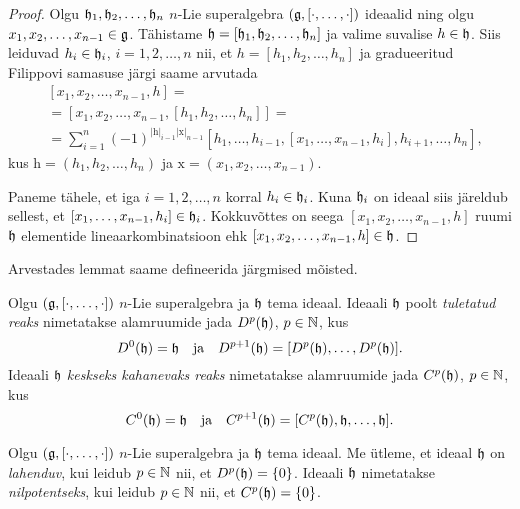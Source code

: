 \begin{proof}
    Olgu $\mathfrak{h}_1, \mathfrak{h}_2, \dots, \mathfrak{h}_n$ $n$-Lie superalgebra
    $(\mathfrak{g}, [\cdot, \dots, \cdot])$ ideaalid ning olgu
    $x_1, x_2, \dots, x_{n-1} \in \mathfrak{g}$. Tähistame
    $\mathfrak{h} = [\mathfrak{h}_1, \mathfrak{h}_2, \dots, \mathfrak{h}_n]$ ja valime suvalise $h \in \mathfrak{h}$.
    Siis leiduvad $h_i \in \mathfrak{h}_i$, $i = 1, 2, \dots, n$ nii, et
    $h = [h_1, h_2, \dots, h_n]$ ja gradueeritud Filippovi samasuse
    järgi saame arvutada
    \begin{align*}
        &[x_1, x_2, \dots, x_{n-1}, h] = \\
        &=[x_1, x_2, \dots, x_{n-1}, [h_1, h_2, \dots, h_n]] = \\
        &=\sum_{i = 1}^{n} (-1)^{|\mathrm{h}|_{i-1} |\mathrm{x}|_{n-1}}
            [h_1, \dots, h_{i-1}, [x_1, \dots, x_{n-1}, h_i],
            h_{i+1}, \dots, h_n],
    \end{align*}
    kus $\mathrm{h} = (h_1, h_2, \dots, h_n)$ ja
    $\mathrm{x} = (x_1, x_2, \dots, x_{n-1})$.

    Paneme tähele, et iga $i = 1, 2, \dots, n$ korral $h_i \in \mathfrak{h}_i$.
    Kuna $\mathfrak{h}_i$ on ideaal siis järeldub sellest, et
    $[x_1, \dots, x_{n-1}, h_i] \in \mathfrak{h}_i$. Kokkuvõttes on seega
    $[x_1, x_2, \dots, x_{n-1}, h]$ ruumi $\mathfrak{h}$ elementide lineaarkombinatsioon ehk $[x_1, x_2, \dots, x_{n-1}, h] \in \mathfrak{h}$.
\end{proof}

Arvestades lemmat saame defineerida järgmised mõisted.

\begin{dfn}
    Olgu $(\mathfrak{g}, [\cdot, \dots, \cdot])$ $n$-Lie superalgebra ja $\mathfrak{h}$
    tema ideaal. Ideaali $\mathfrak{h}$ poolt \emph{tuletatud reaks} nimetatakse
    alamruumide jada $D^p(\mathfrak{h})$, $p \in \mathbb{N}$, kus
    \[
        D^0(\mathfrak{h}) = \mathfrak{h} \quad \text{ja} \quad
        D^{p+1}(\mathfrak{h}) = [D^p(\mathfrak{h}), \dots, D^p(\mathfrak{h})].
    \]
    Ideaali $\mathfrak{h}$ \emph{keskseks kahanevaks reaks} nimetatakse
    alamruumide jada $C^p(\mathfrak{h})$, $p \in \mathbb{N}$, kus
    \[
        C^0(\mathfrak{h}) = \mathfrak{h} \quad \text{ja} \quad
        C^{p+1}(\mathfrak{h}) = [C^p(\mathfrak{h}), \mathfrak{h}, \dots, \mathfrak{h}].
    \]
\end{dfn}

\begin{dfn}
    Olgu $(\mathfrak{g}, [\cdot, \dots, \cdot])$ $n$-Lie superalgebra ja $\mathfrak{h}$
    tema ideaal. Me ütleme, et ideaal $\mathfrak{h}$ on \emph{lahenduv}, kui
    leidub $p \in \mathbb{N}$ nii, et $D^p(\mathfrak{h}) = \{0\}$. Ideaali $\mathfrak{h}$
    nimetatakse \emph{nilpotentseks}, kui leidub $p \in \mathbb{N}$
    nii, et $C^p(\mathfrak{h}) = \{0\}$.
\end{dfn}

